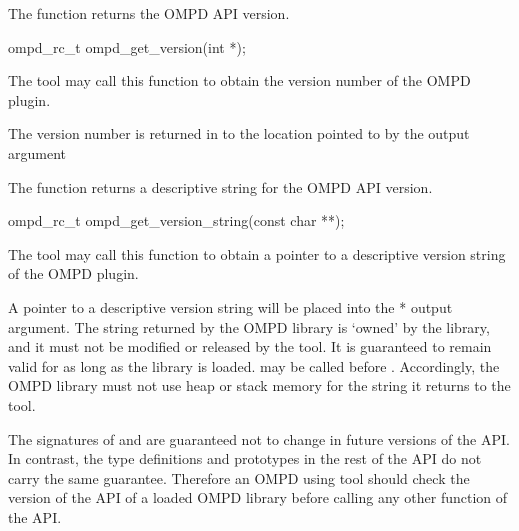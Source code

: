\label{subsubsubsec:ompd_get_version}

\summary
The  function returns the OMPD API version.

\format

\begin{cspecific}
\begin{ompSyntax}
ompd_rc_t ompd_get_version(int *);
\end{ompSyntax}
\end{cspecific}


\descr
The tool may call this function to obtain the version number of the OMPD plugin.

\argdesc
The version number is returned in to the location pointed to by the  output argument 

\label{subsubsubsec:ompd_get_version_string}

\summary
The  function returns a descriptive string for the OMPD API version.

\format

\begin{cspecific}
\begin{ompSyntax}
ompd_rc_t ompd_get_version_string(const char **);
\end{ompSyntax}
\end{cspecific}


\descr
The tool may call this function to obtain a pointer to a descriptive version string of the OMPD plugin.

\argdesc
A pointer to a descriptive version string will be placed into the * output argument.
The string returned by the 
OMPD library is `owned' by the library, and it must not be modified or released by the tool.
It is guaranteed to remain valid for as long as the library is loaded. 
may be called before . Accordingly, the OMPD library must not use heap or 
stack memory for the string it returns to the tool.

The signatures of  and  are 
guaranteed not to change in future versions of the API. In contrast, the type definitions and 
prototypes in the rest of the API do not carry the same guarantee. Therefore an OMPD using tool 
should check the version of the API of a loaded OMPD library before calling any other function of 
the API.

